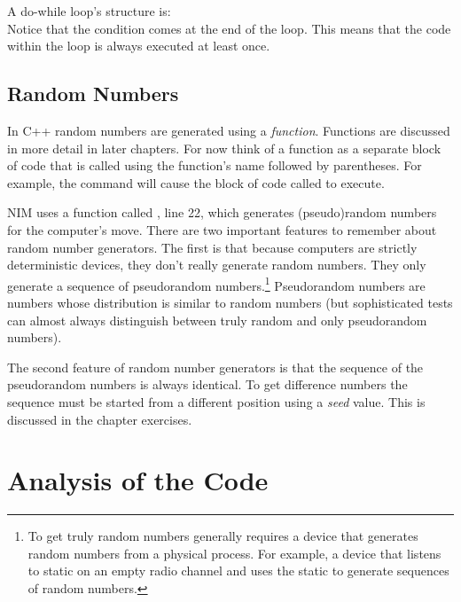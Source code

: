 A do-while loop's structure is:\\
Notice that the condition comes at the end of the loop.  This means that the code within the loop is always executed at least once.  

\subsection{Random Numbers}

In C++ random numbers are generated using a \emph{function}.  Functions are discussed in more detail in later chapters.  For now think of a function as a separate block of code that is called using the function's name followed by parentheses.  For example, the command  will cause the block of code called  to execute.  

NIM uses a function called , line 22, which generates (pseudo)random numbers for the computer's move.  There are two important features to remember about random number generators.  The first is that because computers are strictly deterministic devices, they don't really generate random numbers.  They only generate a sequence of pseudorandom numbers.\footnote{To get truly random numbers generally requires a device  that generates random numbers from a physical process.  For example, a device that listens to static on an empty radio channel and uses the static to generate sequences of random numbers.}  Pseudorandom numbers are numbers whose distribution is similar to random numbers (but sophisticated tests can almost always distinguish between truly random and only pseudorandom numbers).

The second feature of random number generators is that the sequence of the pseudorandom numbers is always identical.  To get difference numbers the sequence must be started from a different position using a \emph{seed} value.  This is discussed in the chapter exercises.

\section{Analysis of the Code}

